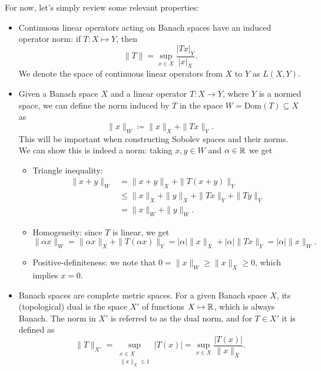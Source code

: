 For now, let's simply review some relevant properties: 
    \begin{itemize}
        \item Continuous linear operators acting on Banach spaces have an induced operator norm: if $T: X\mapsto Y$, then 
        \begin{equation*}
\| T\| =  \sup_{x\in X}\frac{|Tx|_Y}{|x|_X}.
\end{equation*}
        We denote the space of continuous linear operators from $X$ to $Y$ as $L(X,Y)$. 
        \item Given a Banach space $X$ and a linear operator $T:X\to Y$, where $Y$ is a normed space, we can define the norm induced by $T$ in the space $W=\text{Dom}(T)\subseteq X$ as
        \begin{equation*}
\|x\|_{W} \coloneqq \|x\|_X + \|Tx\|_Y.
\end{equation*}
        This will be important when constructing Sobolev spaces and their norms. We can show this is indeed a norm: taking $x,y\in W$ and $\alpha\in \mathbb{R}$ we get
        \begin{itemize}
            \item Triangle inequality:
            \begin{align*}
                \|x+y\|_W &= \|x+y\|_X + \|T(x+y)\|_Y \\
                &\leq \|x\|_X + \|y\|_X + \|Tx\|_Y + \|Ty\|_Y \tag{$\|\cdot\|_X$ and $\|\cdot\|_Y$ are norms}\\
                &= \|x\|_W + \|y\|_W.
            \end{align*}
            \item Homogeneity: since $T$ is linear, we get 
            \begin{equation*}
\|\alpha x\|_W = \|\alpha x\|_X + \|T(\alpha x)\|_Y = |\alpha|\|x\|_X + |\alpha|\|Tx\|_Y = |\alpha|\|x\|_W.
\end{equation*}
            \item Positive-definiteness: we note that $0=\|x\|_W\geq \|x\|_X\geq 0$, which implies $x=0$.
        \end{itemize}
        \item Banach spaces are complete metric spaces. For a given Banach space $X$, its (topological) dual is the space $X'$ of functions $X\mapsto \mathbb{R}$, which is always Banach. The norm in $X'$ is referred to as the dual norm, and for $T\in X'$ it is defined as 
            \begin{equation*}
\|T\|_{X'} = \sup_{\substack{x\in X\\ \|x\|_X\leq 1}} |T(x)|= \sup_{x\in X}\frac{|T(x)|}{\|x\|_X}.

\end{equation*}
\end{itemize}
